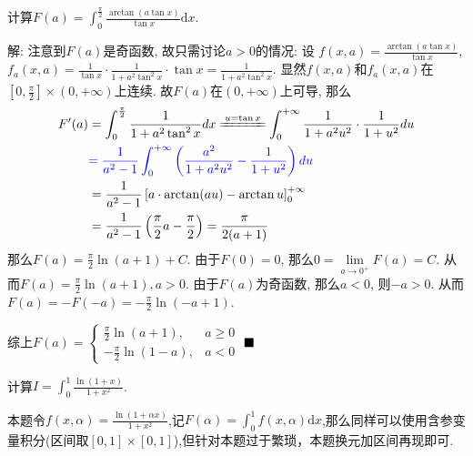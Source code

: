 \documentclass[lang=cn,newtx,10pt,scheme=chinese]{elegantbook}
\begin{document}
\begin{example}
    计算$F(a)= \int_{0}^{\frac{\pi}{2}} \frac{\arctan(a\tan x)}{\tan x } \mathrm d x$.
\end{example}
\begin{solution}
解: 注意到$F(a)$是奇函数, 故只需讨论$a >  0$的情况:
设 $f(x,a) = \frac{\arctan(a\tan x)}{\tan x}$, $f_a(x,a) = \frac{1}{\tan x}\cdot\frac{1}{1+a^2\tan^2x}\cdot\tan x = \frac{1}{1+a^2\tan^2x}$.
显然$f(x,a)$和$f_a(x,a)$在$[0, \frac{\pi}{2}] \times (0, +\infty)$上连续. 故$F(a)$在$(0, +\infty)$上可导, 那么
\begin{align*}
F'(a) &= \int_{0}^{\frac{\pi}{2}} \frac{1}{1+a^2\tan^2x}dx \xlongequal{u=\tan x} \int_{0}^{+\infty}\frac{1}{1+a^2u^2}\cdot\frac{1}{1+u^2}du \\
&\color{blue}{= \frac{1}{a^2-1}\int_{0}^{+\infty}\left(\frac{a^2}{1+a^2u^2}-\frac{1}{1+u^2}\right)du} \\
&= \frac{1}{a^2-1}\left[a\cdot\arctan(au) - \arctan u\right]_0^{+\infty} \\
&= \frac{1}{a^2-1}\left(\frac{\pi}{2}a-\frac{\pi}{2}\right) = \frac{\pi}{2(a+1)}
\end{align*}
那么$F(a)=\frac{\pi}{2}\ln(a+1)+C$. 由于$F(0)=0$, 那么$0=\lim\limits_{a\to 0^+}F(a)=C$.
从而$F(a)=\frac{\pi}{2}\ln(a+1), a>0$.
由于$F(a)$为奇函数, 那么$a<0$, 则$-a>0$.
从而$F(a)=-F(-a)=-\frac{\pi}{2}\ln(-a+1)$.


综上$F(a) = \begin{cases} \frac{\pi}{2}\ln(a+1), & a\ge 0 \\ -\frac{\pi}{2}\ln(1-a), & a<0 \end{cases}$ $\hfill \blacksquare$
\end{solution}


\begin{example}
    计算$I = \int_{0}^{1} \frac{\ln (1+x)}{1+x^2}$.
\end{example}
\begin{remark}
    本题令$f(x,\alpha) = \frac{\ln(1+\alpha x)}{1+x^2}$,记$F(\alpha) = \int_{0}^{1} f(x,\alpha) \mathrm d x$,那么同样可以使用含参变量积分(区间取$[0,1] \times [0,1]$),但针对本题过于繁琐，本题换元加区间再现即可.
\end{remark}
\end{document}
